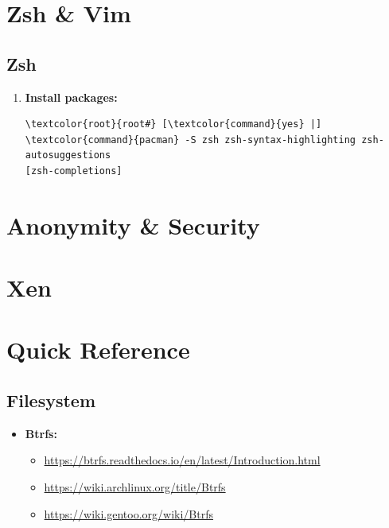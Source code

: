 \documentclass[10pt, a4paper, onecolumn, oneside, titlepage, openany]{book}
\begin{document}
\chapter{Zsh \& Vim}
\section{Zsh}
\begin{enumerate}
    \item \textbf{Install packages:}
\begin{Verbatim}[commandchars=\\\{\}]
\textcolor{root}{root#} [\textcolor{command}{yes} |] \textcolor{command}{pacman} -S zsh zsh-syntax-highlighting zsh-autosuggestions
[zsh-completions]
\end{Verbatim}
\end{enumerate}



\chapter{Anonymity \& Security}


\chapter{Xen}


\chapter{Quick Reference}
\section{Filesystem}
\begin{itemize}
    \item \textbf{Btrfs:}
    \begin{itemize}
        \item \url{https://btrfs.readthedocs.io/en/latest/Introduction.html}
        \item \url{https://wiki.archlinux.org/title/Btrfs}
        \item \url{https://wiki.gentoo.org/wiki/Btrfs}
    \end{itemize}
\end{itemize}
\end{document}
